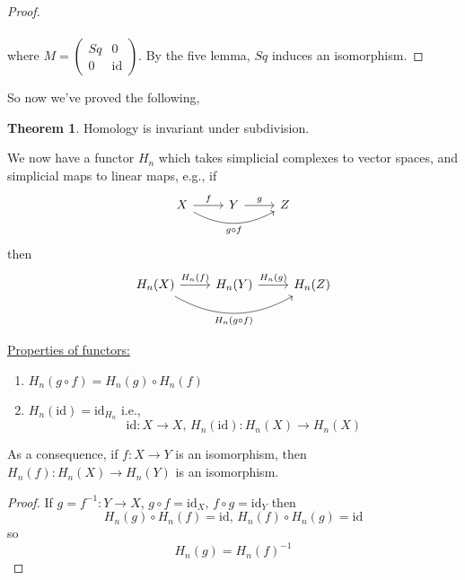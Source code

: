 \documentclass[a4paper,14pt]{extarticle}
\theoremstyle{definition}
\newtheorem*{theorem}{Theorem}
\begin{document}
\begin{proof} \[\]
	 \\
	\vspace{12pt}
	where $M=\begin{pmatrix}Sq&0\\0&\text{id}\end{pmatrix}$. By the five lemma,
	$Sq$ induces an isomorphism.
\end{proof}
So now we've proved the following,

\begin{theorem}
	Homology is invariant under subdivision.
\end{theorem}

We now have a functor $H_n$ which takes simplicial complexes to vector spaces, and 
simplicial maps to linear maps, e.g.,
if 
\[\begin{tikzcd}
	X\ar[r,"f"]\ar[rr,out=-30,in=210,swap,"g\circ f"] & Y\ar[r,"g"] & Z
	\end{tikzcd}\]
then
\[\begin{tikzcd}
	H_n(X)\ar[r,"H_n(f)"]\ar[rr,out=-30,in=210,swap,"H_n(g\circ f)"] & H_n(Y)\ar[r,"H_n(g)"] & 
	H_n(Z)
	\end{tikzcd}\]

\noindent\underline{Properties of functors:}
\begin{enumerate}
	\item $H_n(g\circ f)=H_n(g)\circ H_n(f)$
	\item $H_n(\text{id})=\text{id}_{H_n}$ i.e., \[\text{id}:X\rightarrow X, \,
	H_n(\text{id}):H_n(X)\rightarrow H_n(X)\]
\end{enumerate}

As a consequence, if $f:X\rightarrow Y$ is an isomorphism, then
$H_n(f):H_n(X)\rightarrow H_n(Y)$ is an isomorphism.

\begin{proof}
	If $g=f^{-1}:Y\rightarrow X$, $g\circ f=\text{id}_X, \,f\circ g=\text{id}_Y$ then
	\[H_n(g)\circ H_n(f)=\text{id}, \,H_n(f)\circ H_n(g)=\text{id}\] so
	\[H_n(g)=H_n(f)^{-1}\]
\end{proof}
\end{document}
